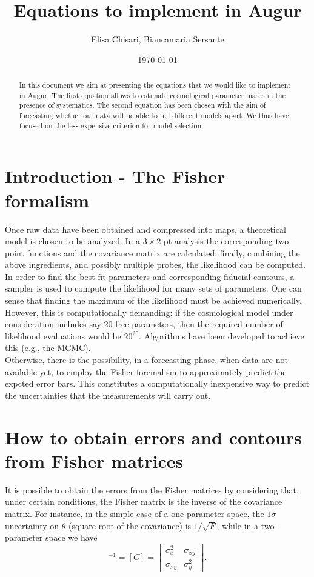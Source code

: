 \documentclass[modern]{lsstdescnote}
\begin{document}
\title{Equations to implement in Augur}
\author{Elisa Chisari, Biancamaria Sersante}
\date{\today}

\begin{abstract}
In this document we aim at presenting the equations that we would like to implement in Augur. 
The first equation allows to estimate cosmological parameter biases in the presence of systematics.
The second equation has been chosen with the aim of forecasting whether our data will be able to tell different models apart.
We thus have focused on the less expensive criterion for model selection.
\end{abstract}

\maketitle

\section{Introduction - The Fisher formalism}
Once raw data have been obtained and compressed into maps, a theoretical model is chosen 
to be analyzed. In a $3\times 2$-pt analysis the corresponding two-point functions and the covariance matrix are calculated;
finally, combining the above ingredients, and possibly multiple probes, the likelihood can be computed.
In order to find the best-fit parameters and corresponding fiducial contours, a sampler is used to compute the likelihood 
for many sets of parameters. One can sense that finding the maximum of the likelihood must be achieved numerically.
However, this is computationally demanding: if the cosmological model under consideration includes say 20 free parameters,
then the required number of likelihood evaluations would be $20^{20}$. Algorithms have been developed to achieve this (e.g., the MCMC).\\
Otherwise, there is the possibility, in a forecasting phase, when data are not available yet, to employ the Fisher 
foremalism to approximately predict the expcted error bars. This constitutes a computationally inexpensive way
to predict the uncertainties that the measurements will carry out.

\section{How to obtain errors and contours from Fisher matrices}
It is possible to obtain the errors from the Fisher matrices by considering that, under certain conditions,
the Fisher matrix is the inverse of the covariance matrix.
For instance, in the simple case of a one-parameter space, the $1\sigma$ uncertainty on $\theta$ (square root of the covariance) is $1/\sqrt{F}$, while in a two-parameter space we have 
\begin{equation}
[F]^{-1}=[C]=\left[\begin{array}{cc}
\sigma_{x}^{2} & \sigma_{x y} \\
\sigma_{x y} & \sigma_{y}^{2}
\end{array}\right].
\end{equation}
\end{document}
